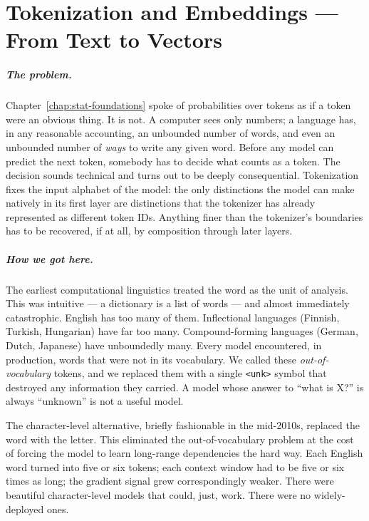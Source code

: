 \chapter{Tokenization and Embeddings — From Text to Vectors}
\label{chap:tokenization}
\label{sec:ch4-tokemb}

\scenelabel
\begin{scenestrip}
\end{scenestrip}

\paragraph{The problem.} Chapter~\ref{chap:stat-foundations} spoke of probabilities over
tokens as if a token were an obvious thing. It is not. A computer
sees only numbers; a language has, in any reasonable accounting,
an unbounded number of words, and even an unbounded number of
\emph{ways} to write any given word. Before any model can predict
the next token, somebody has to decide what counts as a token. The
decision sounds technical and turns out to be deeply
consequential. Tokenization fixes the input alphabet of the model:
the only distinctions the model can make natively in its first
layer are distinctions that the tokenizer has already represented
as different token IDs. Anything finer than the tokenizer's
boundaries has to be recovered, if at all, by composition through
later layers.

\paragraph{How we got here.} The earliest computational
linguistics treated the word as the unit of analysis. This was
intuitive --- a dictionary is a list of words --- and almost
immediately catastrophic. English has too many of them.
Inflectional languages (Finnish, Turkish, Hungarian) have far too
many. Compound-forming languages (German, Dutch, Japanese) have
unboundedly many. Every model encountered, in production, words
that were not in its vocabulary. We called these
\emph{out-of-vocabulary} tokens, and we replaced them with a
single \texttt{<unk>} symbol that destroyed any information they
carried. A model whose answer to ``what is X?'' is always
``unknown'' is not a useful model.

The character-level alternative, briefly fashionable in the
mid-2010s, replaced the word with the letter. This eliminated the
out-of-vocabulary problem at the cost of forcing the model to
learn long-range dependencies the hard way. Each English word
turned into five or six tokens; each context window had to be
five or six times as long; the gradient signal grew correspondingly
weaker. There were beautiful character-level models that could,
just, work. There were no widely-deployed ones.

